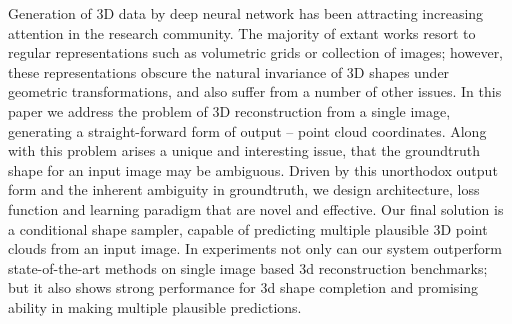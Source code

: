 Generation of 3D data by deep neural network has been attracting increasing attention in the research community. The majority of extant works resort to regular representations such as volumetric grids or collection of images; however, these representations obscure the natural invariance of 3D shapes under geometric transformations, and also suffer from a number of other issues.
In this paper we address the problem of 3D reconstruction from a single image, generating a straight-forward form of output -- point cloud coordinates. Along with this problem arises a unique and interesting issue, that the groundtruth shape for an input image may be ambiguous. Driven by this unorthodox output form and the inherent ambiguity in groundtruth, we design architecture, loss function and learning paradigm that are novel and effective. Our final solution is a conditional shape sampler, capable of predicting multiple plausible 3D point clouds from an input image.
In experiments not only can our system outperform state-of-the-art methods on single image based 3d reconstruction benchmarks; but it also shows strong performance for 3d shape completion and promising ability in making multiple plausible predictions.